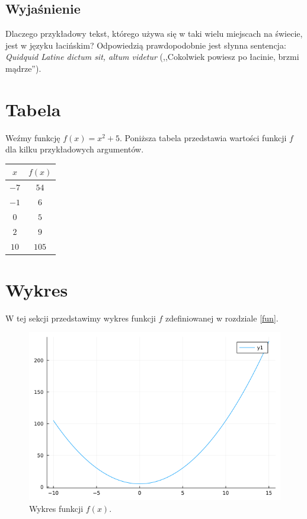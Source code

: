 \documentclass{article}
\begin{document}
\subsection{Wyjaśnienie}

Dlaczego przykładowy tekst, którego używa się w taki wielu miejscach na świecie, jest w języku łacińskim? Odpowiedzią prawdopodobnie jest słynna sentencja: \textit{Quidquid Latine dictum sit, altum videtur} (,,Cokolwiek powiesz po łacinie, brzmi mądrze'').

\section{Tabela}

Weźmy funkcję \(\label{fun} f(x) = x^2 + 5\). Poniższa tabela przedstawia wartości funkcji \(f\) dla kilku przykładowych argumentów.

\begin{center}
    \begin{tabular}{|c|c|}
        \hline
        \(x\) & \(f(x)\) \\
        \hline \hline
        \(-7\) & \(54\) \\
        \(-1\) & \(6\) \\
        \(0\) & \(5\) \\  
        \(2\) & \(9\) \\
        \(10\) & \(105\) \\
        \hline
    \end{tabular}
\end{center}

\section{Wykres}

W tej sekcji przedstawimy wykres funkcji \(f\) zdefiniowanej w rozdziale \ref{fun}.

\begin{figure}[h]
    \centering
    \includegraphics[width=\textwidth]{plot.png}
    \caption{Wykres funkcji \(f(x)\).}
    \label{fig:my_label}
\end{figure}
\end{document}

